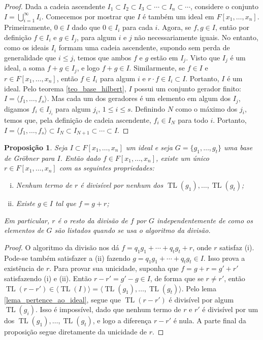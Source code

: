 \documentclass[12pt,a4paper]{report}
\newtheorem{proposition}[theorem]{Proposição}
\numberwithin{theorem}{chapter}
\DeclareMathOperator{\TL}{TL}
\begin{document}
\begin{proof}
  Dada a cadeia ascendente \(I_1 \subset I_2 \subset I_3 \subset
  \cdots \subset I_n \subset \cdots\), considere o conjunto \(I =
  \bigcup\limits_{i=1}^\infty I_i\).  Comecemos por mostrar que \(I\)
  é também um ideal em \(F[x_1,\ldots,x_n]\).  Primeiramente, \(0 \in
  I\) dado que \(0 \in I_i\) para cada \(i\).  Agora, se \(f, g \in
  I\), então por definição \(f \in I_i\) e \(g \in I_j\), para algum
  \(i\) e \(j\) não necessariamente iguais.  No entanto, como os
  ideais \(I_i\) formam uma cadeia ascendente, supondo sem perda de
  generalidade que \(i \leq j\), temos que ambos \(f\) e \(g\) estão
  em \(I_j\).  Visto que \(I_j\) é um ideal, a soma \(f + g \in I_j\),
  e logo \(f + g \in I\).  Similarmente, se \(f \in I\) e \(r \in
  F[x_1,\ldots,x_n]\), então \(f \in I_i\) para algum \(i\) e \(r
  \cdot f \in I_i \subset I\).  Portanto, \(I\) é um ideal.  Pelo
  teorema \ref{teo_base_hilbert}, \(I\) possui um conjunto gerador
  finito: \(I = \langle f_1,\ldots,f_s \rangle\).  Mas cada um dos
  geradores é um elemento em algum dos \(I_j\), digamos \(f_i \in
  I_{j_i}\) para algum \(j_i\), \(1 \leq i \leq s\).  Definindo \(N\)
  como o máximo dos \(j_i\), temos que, pela definição de cadeia
  ascendente, \(f_i \in I_N\) para todo \(i\).  Portanto, \(I =
  \langle f_1,\ldots,f_s \rangle \subset I_N \subset I_{N+1} \subset
  \cdots \subset I\).
\end{proof}

\begin{proposition}\label{prop_grob_resto}
  Seja \(I \subset F[x_1,\ldots,x_n]\) um ideal e seja \(G =
  \{g_1,\ldots,g_t\}\) uma base de Gröbner para \(I\).  Então dado \(f
  \in F[x_1,\ldots,x_n]\), existe um único \(r \in F[x_1,\ldots,x_n]\)
  com as seguintes propriedades:
  \begin{enumerate}[(i)]
  \item Nenhum termo de \(r\) é divisível por nenhum dos
    \(\TL(g_1),\ldots,\TL(g_t)\);
  \item Existe \(g \in I\) tal que \(f = g + r\);
  \end{enumerate}
  Em particular, \(r\) é o resto da divisão de \(f\) por \(G\)
  independentemente de como os elementos de \(G\) são listados quando
  se usa o algoritmo da divisão.
\end{proposition}

\begin{proof}
  O algoritmo da divisão nos dá \(f = q_1g_1 + \cdots + q_tg_t + r\),
  onde \(r\) satisfaz (i).  Pode-se também satisfazer a (ii) fazendo
  \(g = q_1g_1 + \cdots + q_tg_t \in I\).  Isso prova a existência de
  \(r\).  Para provar sua unicidade, suponha que \(f = g + r = g' +
  r'\) satisfazendo (i) e (ii).  Então \(r - r' = g' - g \in I\), de
  forma que se \(r \neq r'\), então \(\TL(r - r') \in \langle \TL(I)
  \rangle = \langle \TL(g_1),\ldots,\TL(g_t) \rangle\).  Pelo lema
  \ref{lema_pertence_ao_ideal}, segue que \(\TL(r-r')\) é divisível
  por algum \(\TL(g_i)\).  Isso é impossível, dado que nenhum termo de
  \(r\) e \(r'\) é divisível por um dos \(\TL(g_1),\ldots,\TL(g_t)\),
  e logo a diferença \(r-r'\) é nula.  A parte final da proposição
  segue diretamente da unicidade de \(r\).
\end{proof}
\end{document}
